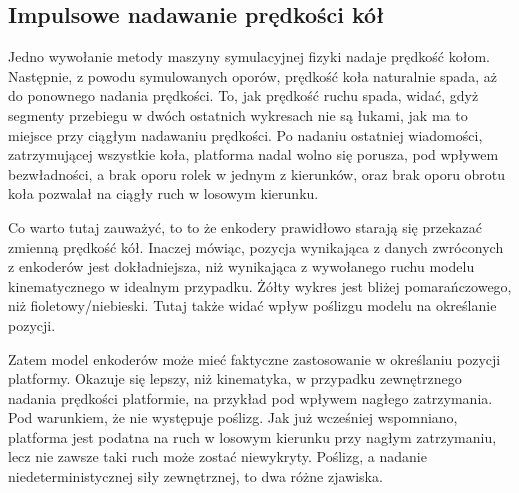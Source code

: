 	\subsection{Impulsowe nadawanie prędkości kół}
		Jedno wywołanie metody maszyny symulacyjnej fizyki nadaje prędkość kołom. Następnie, z powodu symulowanych oporów, prędkość koła naturalnie spada, aż do
		ponownego nadania prędkości. To, jak prędkość ruchu spada, widać, gdyż segmenty przebiegu w dwóch ostatnich wykresach nie są łukami, jak ma to miejsce przy 
		ciągłym nadawaniu prędkości. Po nadaniu ostatniej wiadomości, zatrzymującej wszystkie koła, platforma nadal wolno się porusza, pod wpływem bezwładności, a brak oporu rolek w jednym z kierunków, oraz brak oporu obrotu koła pozwalał na ciągły ruch w losowym kierunku.
		
		Co warto tutaj zauważyć, to to że enkodery prawidłowo starają się przekazać zmienną prędkość kół. 
		Inaczej mówiąc, pozycja wynikająca z danych zwróconych z enkoderów jest dokładniejsza, niż wynikająca z wywołanego ruchu modelu kinematycznego w idealnym przypadku.
		Żółty wykres jest bliżej pomarańczowego, niż fioletowy/niebieski.
		Tutaj także widać wpływ poślizgu modelu na określanie pozycji.
		
		Zatem model enkoderów może mieć faktyczne zastosowanie w określaniu pozycji platformy. 
		Okazuje się lepszy, niż kinematyka, w przypadku zewnętrznego nadania prędkości platformie, na przykład pod wpływem nagłego zatrzymania.
		Pod warunkiem, że nie występuje poślizg. Jak już wcześniej wspomniano, platforma jest podatna na ruch w losowym kierunku przy nagłym zatrzymaniu,
		lecz nie zawsze taki ruch może zostać niewykryty. Poślizg, a nadanie niedeterministycznej siły zewnętrznej, to dwa różne zjawiska.
		
